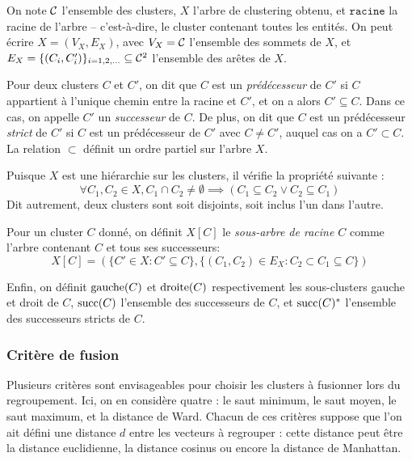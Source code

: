 On note $\mathcal{C}$ l'ensemble des clusters, $X$ l'arbre de clustering obtenu, et $\texttt{racine}$ la racine de l'arbre – c'est-à-dire, le cluster contenant toutes les entités. On peut écrire $X = (V_X, E_X)$, avec $V_X = \mathcal{C}$ l'ensemble des sommets de $X$, et $E_X = \{(C_i, C_i')\}_{i = 1, 2, \ldots } \subseteq \mathcal{C}^2$ l'ensemble des arêtes de $X$.

Pour deux clusters $C$ et $C'$, on dit que $C$ est un \textit{prédécesseur} de $C'$ si $C$ appartient à l'unique chemin entre la racine et $C'$, et on a alors $C' \subseteq C$. Dans ce cas, on appelle $C'$ un \textit{successeur} de $C$. De plus, on dit que $C$ est un prédécesseur \textit{strict} de $C'$ si $C$ est un prédécesseur de $C'$ avec $C \neq C'$, auquel cas on a $C' \subset C$. La relation $\subset$ définit un ordre partiel sur l'arbre $X$.

Puisque $X$ est une hiérarchie sur les clusters, il vérifie la propriété suivante :
\begin{equation}
    \forall C_1, C_2 \in X, C_1 \cap C_2 \neq \emptyset \implies (C_1 \subseteq C_2 \lor C_2 \subseteq C_1)
\end{equation}
Dit autrement, deux clusters sont soit disjoints, soit inclus l'un dans l'autre.

Pour un cluster $C$ donné, on définit $X[C]$ le \textit{sous-arbre de racine $C$} comme l'arbre contenant $C$ et tous ses successeurs:
\begin{equation}
    X[C] = (\{C' \in X : C' \subseteq C\}, \{(C_1, C_2) \in E_X : C_2 \subset C_1 \subseteq C\})
\end{equation}

Enfin, on définit $\operatorname{gauche}(C)$ et $\operatorname{droite}(C)$ respectivement les sous-clusters gauche et droit de $C$, $\operatorname{succ}(C)$ l'ensemble des successeurs de $C$, et $\operatorname{succ}(C)^*$ l'ensemble des successeurs stricts de $C$.

\subsubsection{Critère de fusion}
\label{sec:te-clustering-linkage}

Plusieurs critères sont envisageables pour choisir les clusters à fusionner lors du regroupement. Ici, on en considère quatre : le saut minimum, le saut moyen, le saut maximum, et la distance de Ward. Chacun de ces critères suppose que l'on ait défini une distance $d$ entre les vecteurs à regrouper : cette distance peut être la distance euclidienne, la distance cosinus ou encore la distance de Manhattan. 

